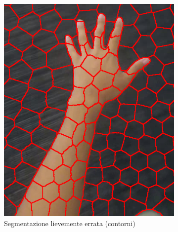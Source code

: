 \documentclass[12pt,a4paper,oneside]{article}
\begin{document}
\begin{figure}[!htb]	
	\centering
	\begin{subfigure}[t]{.325\textwidth}
		\includegraphics[width=\textwidth]{resources/images/drifting300a.png}
		\captionsetup{justification=centering}
		\caption{Segmentazione lievemente errata (contorni)}\label{es_drifting_300a}
	\end{subfigure}%
	\hfill
	\begin{subfigure}[t]{.325\textwidth}

\end{subfigure}
\end{figure}
\end{document}

